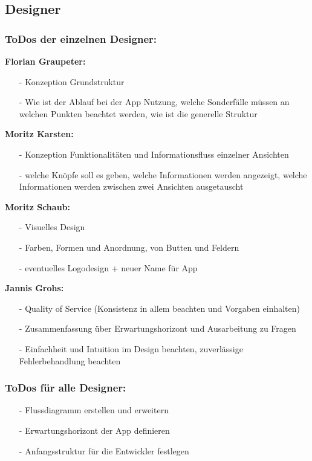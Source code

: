 \documentclass[12pt,a4paper]{article}
\begin{document}
 \newpage
 
\subsection{Designer}
\subsubsection*{ToDos der einzelnen Designer:}
\textbf{Florian Graupeter:}
\begin{itemize}
\item[-]Konzeption Grundstruktur
\item[-]Wie ist der Ablauf bei der App Nutzung, welche Sonderfälle müssen an welchen Punkten beachtet werden, wie ist die generelle Struktur
\end{itemize}
\textbf{Moritz Karsten:}
\begin{itemize}
\item[-]Konzeption Funktionalitäten und Informationsfluss einzelner Ansichten
\item[-]welche Knöpfe soll es geben, welche Informationen werden angezeigt, welche Informationen werden zwischen zwei Ansichten ausgetauscht
\end{itemize}
\textbf{Moritz Schaub:}
\begin{itemize}
\item[-]Visuelles Design
\item[-]Farben, Formen und Anordnung, von Butten und Feldern 
\item[-]eventuelles Logodesign + neuer Name für App
\end{itemize}
\textbf{Jannis Grohs:}
\begin{itemize}
\item[-]Quality of Service (Konsistenz in allem beachten und Vorgaben einhalten)
\item[-]Zusammenfassung über Erwartungshorizont und Ausarbeitung zu Fragen
\item[-]Einfachheit und Intuition im Design beachten, zuverlässige Fehlerbehandlung beachten
\end{itemize}
\subsubsection*{ToDos für alle Designer:}
\begin{itemize}
\item[-]Flussdiagramm erstellen und erweitern
\item[-]Erwartungshorizont der App definieren
\item[-]Anfangsstruktur für die Entwickler festlegen
\end{itemize}
\newpage
\end{document}
